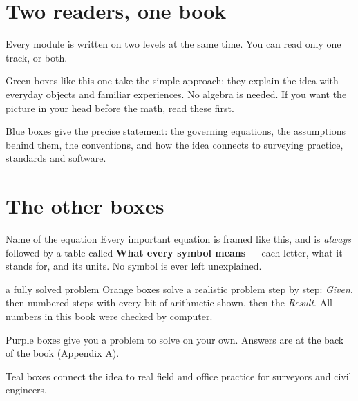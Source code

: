 \section*{Two readers, one book}
Every module is written on two levels at the same time. You can read only one track, or both.

\begin{kid}
Green boxes like this one take the simple approach: they explain the idea with everyday objects and familiar experiences. No algebra is needed. If you want the picture in your head before the math, read these first.
\end{kid}

\begin{eng}
Blue boxes give the precise statement: the governing equations, the assumptions behind them, the conventions, and how the idea connects to surveying practice, standards and software.
\end{eng}

\section*{The other boxes}
\begin{keyeq}{Name of the equation}
Every important equation is framed like this, and is \emph{always} followed by a table called \textbf{What every symbol means} --- each letter, what it stands for, and its units. No symbol is ever left unexplained.
\end{keyeq}

\begin{worked}{a fully solved problem}
Orange boxes solve a realistic problem step by step: \emph{Given}, then numbered steps with every bit of arithmetic shown, then the \emph{Result}. All numbers in this book were checked by computer.
\end{worked}

\begin{tryit}
Purple boxes give you a problem to solve on your own. Answers are at the back of the book (Appendix A).
\end{tryit}

\begin{tip}
Teal boxes connect the idea to real field and office practice for surveyors and civil engineers.
\end{tip}

